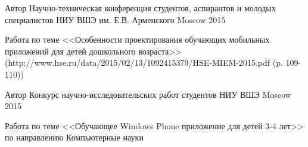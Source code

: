 \begin{cventries}

\cventry
{Автор} %
{Научно-техническая конференция студентов, аспирантов и молодых специалистов НИУ ВШЭ им. Е.В. Арменского} %
{Moscow} %
{2015} %
{ %
\begin{cvitems}
\item {Работа по теме <<Особенности проектирования обучающих мобильных приложений для детей дошкольного возраста>>
	\\ (http://www.hse.ru/data/2015/02/13/1092415379/HSE-MIEM-2015.pdf (p. 109-110))}
\end{cvitems}
}

\cventry
{Автор} %
{Конкурс научно-исследовательских работ студентов НИУ ВШЭ} %
{Moscow} %
{2015} %
{ %
\begin{cvitems}
\item {Работа по теме <<Обучающее Windows Phone приложение для детей 3-4 лет>> по направлению Компьютерные науки}
\end{cvitems}
}

\end{cventries}